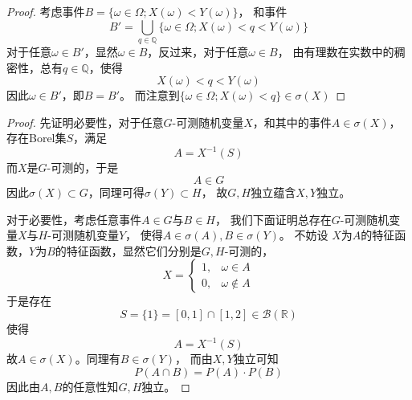 \documentclass[cn]{homework}
\begin{document}
\begin{subproblem}
\begin{proof}
            考虑事件$B=\{\omega\in\Omega;X(\omega)<Y(\omega)\}$，
            和事件
            \[B'=\bigcup_{q\in\mathbb Q}\{\omega\in\Omega;X(\omega)<q<Y(\omega)\}\]
            对于任意$\omega\in B'$，显然$\omega\in B$，反过来，对于任意$\omega\in B$，
            由有理数在实数中的稠密性，总有$q\in\mathbb Q$，使得
            \[X(\omega)<q<Y(\omega)\]
            因此$\omega\in B'$，即$B=B'$。
            而注意到$\{\omega\in\Omega;X(\omega)<q\}\in\sigma(X)$
            
        \end{proof}
    \end{subproblem}

    \problem
    \begin{subproblem}
        \item
        \begin{proof}
            先证明必要性，对于任意$G$-可测随机变量$X$，和其中的事件$A\in\sigma(X)$，
            存在Borel集$S$，满足
            \[A=X^{-1}(S)\]
            而$X$是$G$-可测的，于是
            \[A\in G\]
            因此$\sigma(X)\subset G$，同理可得$\sigma(Y)\subset H$，
            故$G,H$独立蕴含$X,Y$独立。

            对于必要性，考虑任意事件$A\in G$与$B\in H$，
            我们下面证明总存在$G$-可测随机变量$X$与$H$-可测随机变量$Y$，
            使得$A\in\sigma(A),B\in\sigma(Y)$。
            不妨设
            $X$为$A$的特征函数，$Y$为$B$的特征函数，显然它们分别是$G,H$-可测的，
            \[X=\begin{cases}
                1,&\omega\in A\\
                0,&\omega\not\in A
            \end{cases}\]
            于是存在
            \[S=\{1\}=[0,1]\cap[1,2]\in\mathcal B(\mathbb R)\]
            使得
            \[A=X^{-1}(S)\]
            故$A\in\sigma(X)$。同理有$B\in\sigma(Y)$，
            而由$X,Y$独立可知
            \[P(A\cap B)=P(A)\cdot P(B)\]
            因此由$A,B$的任意性知$G,H$独立。
        \end{proof}


\end{subproblem}
\end{document}

